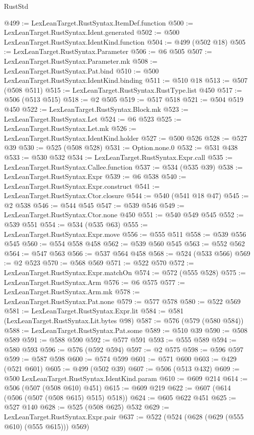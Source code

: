 \begin{lexlean}{RustStd}
\begin{coremodule}
@499 := LexLeanTarget.RustSyntax.ItemDef.function
@500 := LexLeanTarget.RustSyntax.Ident.generated
@502 := @500 LexLeanTarget.RustSyntax.IdentKind.function
@504 := @499 (@502 @18)
@505 := LexLeanTarget.RustSyntax.Parameter
@506 := @6 @505
@507 := LexLeanTarget.RustSyntax.Parameter.mk
@508 := LexLeanTarget.RustSyntax.Pat.bind
@510 := @500 LexLeanTarget.RustSyntax.IdentKind.binding
@511 := @510 @18
@513 := @507 (@508 @511)
@515 := LexLeanTarget.RustSyntax.RustType.list @450
@517 := @506 (@513 @515)
@518 := @2 @505
@519 := @517 @518
@521 := @504 @519 @450
@522 := LexLeanTarget.RustSyntax.Block.mk
@523 := LexLeanTarget.RustSyntax.Let
@524 := @6 @523
@525 := LexLeanTarget.RustSyntax.Let.mk
@526 := LexLeanTarget.RustSyntax.IdentKind.holder
@527 := @500 @526
@528 := @527 @39
@530 := @525 (@508 @528)
@531 := Option.none.{0}
@532 := @531 @438
@533 := @530 @532
@534 := LexLeanTarget.RustSyntax.Expr.call
@535 := LexLeanTarget.RustSyntax.Callee.function
@537 := @534 (@535 @39)
@538 := LexLeanTarget.RustSyntax.Expr
@539 := @6 @538
@540 := LexLeanTarget.RustSyntax.Expr.construct
@541 := LexLeanTarget.RustSyntax.Ctor.closure
@544 := @540 (@541 @18 @47)
@545 := @2 @538
@546 := @544 @545
@547 := @539 @546
@549 := LexLeanTarget.RustSyntax.Ctor.none @450
@551 := @540 @549 @545
@552 := @539 @551
@554 := @534 (@535 @63)
@555 := LexLeanTarget.RustSyntax.Expr.move
@556 := @555 @511
@558 := @539 @556 @545
@560 := @554 @558 @458
@562 := @539 @560 @545
@563 := @552 @562
@564 := @547 @563
@566 := @537 @564 @458
@568 := @524 (@533 @566)
@569 := @2 @523
@570 := @568 @569
@571 := @522 @570
@572 := LexLeanTarget.RustSyntax.Expr.matchOn
@574 := @572 (@555 @528)
@575 := LexLeanTarget.RustSyntax.Arm
@576 := @6 @575
@577 := LexLeanTarget.RustSyntax.Arm.mk
@578 := LexLeanTarget.RustSyntax.Pat.none
@579 := @577 @578
@580 := @522 @569
@581 := LexLeanTarget.RustSyntax.Expr.lit
@584 := @581 (LexLeanTarget.RustSyntax.Lit.bytes @98)
@587 := @576 (@579 (@580 @584))
@588 := LexLeanTarget.RustSyntax.Pat.some
@589 := @510 @39
@590 := @508 @589
@591 := @588 @590
@592 := @577 @591
@593 := @555 @589
@594 := @580 @593
@596 := @576 (@592 @594)
@597 := @2 @575
@598 := @596 @597
@599 := @587 @598
@600 := @574 @599
@601 := @571 @600
@603 := @429 (@521 @601)
@605 := @499 (@502 @39)
@607 := @506 (@513 @432)
@609 := @500 LexLeanTarget.RustSyntax.IdentKind.param
@610 := @609 @214
@614 := @506 (@507 (@508 @610) @451)
@615 := @609 @219
@622 := @607 (@614 (@506 (@507 (@508 @615) @515) @518))
@624 := @605 @622 @451
@625 := @527 @140
@628 := @525 (@508 @625) @532
@629 := LexLeanTarget.RustSyntax.Expr.pair
@637 := @522 (@524 (@628 (@629 (@555 @610) (@555 @615))) @569)

\end{coremodule}
\end{lexlean}
